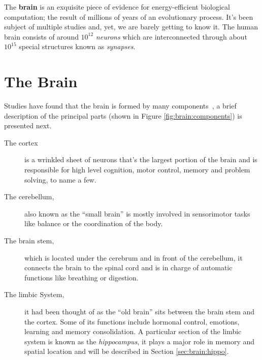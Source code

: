 
The \textbf{brain} is an exquisite piece of evidence for energy-efficient biological computation; the result of millions of years of an evolutionary process. It's been subject of multiple studies and, yet, we are barely getting to know it. The human brain consists of around $10^{12}$ \emph{neurons} which are interconnected through about $10^{15}$ special structures known as \emph{synapses}.
\section{The Brain}
\label{sec:brain:brain}
Studies have found that the brain is formed by many components~\cite{thompson2000brain}, a brief description of the principal parts (shown in Figure \ref{fig:brain:components}) is presented next. 
\begin{description}
  \item[The cortex] is a wrinkled sheet of neurons that's the largest portion of the brain and is responsible for high level cognition, motor control, memory and problem solving, to name a few.
  \item[The cerebellum,] also known as the ``small brain'' is mostly involved in sensorimotor tasks like balance or the coordination of the body.
  \item[The brain stem,] which is located under the cerebrum and in front of the cerebellum, it connects the brain to the spinal cord and is in charge of automatic functions like breathing or digestion.
  \item[The limbic System,] it had been thought of as the ``old brain'' sits between the brain stem and the cortex. Some of its functions include hormonal control, emotions, learning and memory consolidation. A particular section of the limbic system is known as the \emph{hippocampus}, it plays a major role in memory and spatial location and will be described in Section \ref{sec:brain:hippo}.
\end{description}

